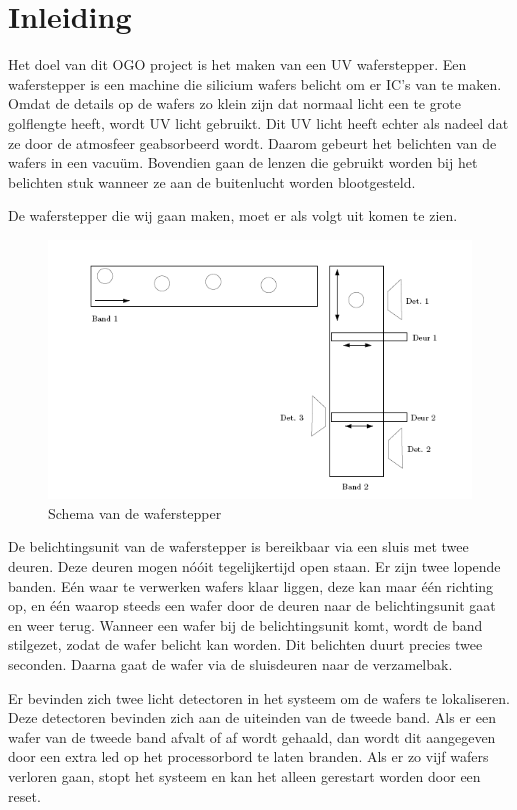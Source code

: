 

\chapter{Inleiding}
Het doel van dit OGO project is het maken van een UV waferstepper.
Een waferstepper is een machine die silicium wafers belicht om er
IC's van te maken. Omdat de details op de wafers zo klein zijn dat
normaal licht een te grote golflengte heeft, wordt UV licht
gebruikt. Dit UV licht heeft echter als nadeel dat ze door de
atmosfeer geabsorbeerd wordt. Daarom gebeurt het belichten van de
wafers in een vacu\"um. Bovendien gaan de lenzen die gebruikt worden
bij het belichten stuk wanneer ze aan de buitenlucht worden
blootgesteld.


De waferstepper die wij gaan maken, moet er als volgt uit komen te
zien.

\begin{figure}[!h]
\begin{center}
\includegraphics[width=0.8\linewidth]{schets}
\end{center}
\caption{Schema van de waferstepper}
\label{fig:schema}
\end{figure}

De belichtingsunit van de waferstepper is bereikbaar via een sluis
met twee deuren. Deze deuren mogen n\'{o}\'{o}it tegelijkertijd open
staan. Er zijn twee lopende banden. E\'{e}n waar te verwerken wafers
klaar liggen, deze kan maar \'{e}\'{e}n richting op, en \'{e}\'{e}n
waarop steeds een wafer door de deuren naar de belichtingsunit gaat
en weer terug. Wanneer een wafer bij de belichtingsunit komt, wordt
de band stilgezet, zodat de wafer belicht kan worden. Dit belichten
duurt precies twee seconden. Daarna gaat de wafer via de sluisdeuren
naar de verzamelbak.

Er bevinden zich twee licht detectoren in het systeem om de wafers
te lokaliseren. Deze detectoren bevinden zich aan de uiteinden van
de tweede band. Als er een wafer van de tweede band afvalt of af
wordt gehaald, dan wordt dit aangegeven door een extra led op het
processorbord te laten branden. Als er zo vijf wafers verloren gaan,
stopt het systeem en kan het alleen gerestart worden door een reset.

